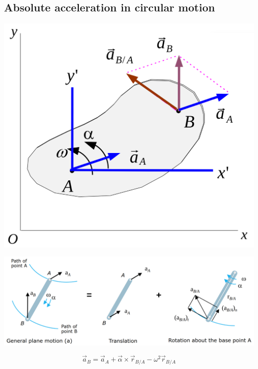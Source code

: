 \documentclass[11pt]{article}
\begin{document}
\subsection{Absolute acceleration in circular motion}
\label{sec:org16ba2f9}
\begin{center}
\includegraphics[width=.9\linewidth]{./images/planar-motion-of-a-rigid-slab-acceleration.png}
\end{center}
\begin{center}
\includegraphics[width=.9\linewidth]{./images/relative-motion-analysis-acceleration.png}
\end{center}
\[\vec{a}_B = \vec{a}_A + \vec{\alpha} \times \vec{r}_{B/A} - \omega^2 \vec{r}_{B/A}\]

 \newpage
\end{document}
